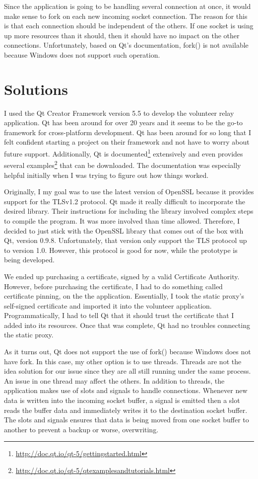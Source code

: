 \documentclass[12pt,a4paper]{report}
\begin{document}
	Since the application is going to be handling several connection at once, it would make sense to fork on each new incoming socket connection. The reason for this is that each connection should be independent of the others. If one socket is using up more resources than it should, then it should have no impact on the other connections. Unfortunately, based on Qt's documentation, fork() is not available because Windows does not support such operation. 
	
	\section{Solutions}
	I used the Qt Creator Framework version 5.5 to develop the volunteer relay application. Qt has been around for over 20 years and it seems to be the go-to framework for cross-platform development. Qt has been around for so long that I felt confident starting a project on their framework and not have to worry about future support. Additionally, Qt is documented\footnote{\url{http://doc.qt.io/qt-5/gettingstarted.html}} extensively and even provides several examples\footnote{\url{http://doc.qt.io/qt-5/qtexamplesandtutorials.html}} that can be downloaded. The documentation was especially helpful initially when I was trying to figure out how things worked.
	
	Originally, I my goal was to use the latest version of OpenSSL because it provides support for the TLSv1.2 protocol. Qt made it really difficult to incorporate the desired library. Their instructions for including the library involved complex steps to compile the program. It was more involved than time allowed. Therefore, I decided to just stick with the OpenSSL library that comes out of the box with Qt, version 0.9.8. Unfortunately, that version only support the TLS protocol up to version 1.0. However, this protocol is good for now, while the prototype is being developed. 
	
	We ended up purchasing a certificate, signed by a valid Certificate Authority. However, before purchasing the certificate, I had to do something called certificate pinning, on the the application. Essentially, I took the static proxy's self-signed certificate and imported it into the volunteer application. Programmatically, I had to tell Qt that it should trust the certificate that I added into its resources. Once that was complete, Qt had no troubles connecting the static proxy. 
	
	As it turns out, Qt does not support the use of fork() because Windows does not have fork. In this case, my other option is to use threads. Threads are not the idea solution for our issue since they are all still running under the same process. An issue in one thread may affect the others. In addition to threads, the application makes use of slots and signals to handle connections. Whenever new data is written into the incoming socket buffer, a signal is emitted then a slot reads the buffer data and immediately writes it to the destination socket buffer. The slots and signals ensures that data is being moved from one socket buffer to another to prevent a backup or worse, overwriting.   
	
\end{document}
